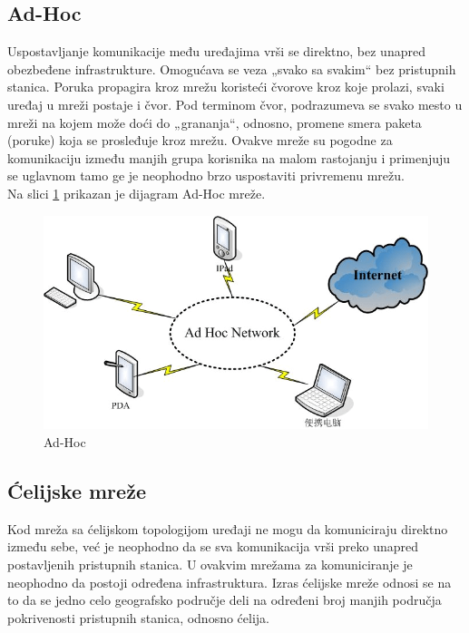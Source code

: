 \documentclass[a4paper]{article}
\begin{document}
{    \subsection{Ad-Hoc}
Uspostavljanje komunikacije među uređajima vrši se direktno, bez unapred obezbeđene infrastrukture. Omogućava se veza „svako sa svakim“ bez pristupnih stanica. Poruka propagira kroz mrežu koristeći čvorove kroz koje prolazi, svaki uređaj u mreži postaje i čvor. Pod terminom čvor, podrazumeva se svako mesto u mreži na kojem može doći do „grananja“, odnosno, promene smera paketa (poruke) koja se prosleđuje kroz mrežu. Ovakve mreže su pogodne za komunikaciju između manjih grupa korisnika na malom rastojanju i primenjuju se uglavnom tamo ge je neophodno brzo uspostaviti privremenu mrežu.\\
Na slici \ref{fig:adhoc} prikazan je dijagram Ad-Hoc mreže.
\newpage

\begin{figure}[h!]
\begin{center}
\includegraphics[scale=0.35]{AdHoc.png}
\end{center}
\caption{Ad-Hoc \cite{AdHoc}}
\label{fig:adhoc}
\end{figure}



    \subsection{Ćelijske mreže}
 Kod mreža sa ćelijskom topologijom uređaji ne mogu da komuniciraju direktno između sebe, već je neophodno da se sva komunikacija vrši preko unapred postavljenih pristupnih stanica. U ovakvim mrežama za komuniciranje je neophodno da postoji određena infrastruktura. Izras ćelijske mreže odnosi se na to da se jedno celo geografsko područje deli na određeni broj manjih područja pokrivenosti pristupnih stanica, odnosno ćelija.

}
\end{document}
